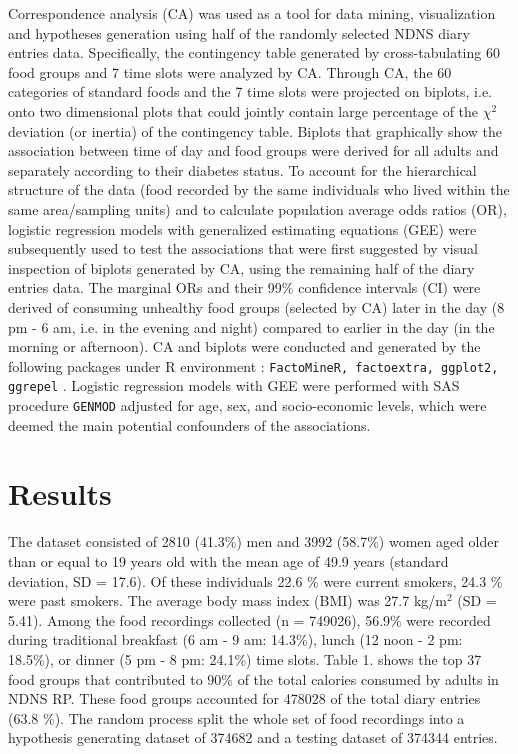 \documentclass{bmcart}
\begin{document}
Correspondence analysis (CA) \cite{greenacre2017correspondence,Chapman2017,palla2020adolescents} was used as a tool for data mining, visualization and hypotheses generation using half of the randomly selected NDNS diary entries data. Specifically, the contingency table generated by cross-tabulating 60 food groups and 7 time slots were analyzed by CA. Through CA, the 60 categories of standard foods and the 7 time slots were projected on biplots, i.e. onto two dimensional plots that could jointly contain large percentage of the $\chi^2$ deviation (or inertia) of the contingency table. Biplots that graphically show the association between time of day and food groups were derived for all adults and separately according to their diabetes status. To account for the hierarchical structure of the data (food recorded by the same individuals who lived within the same area/sampling units) and to calculate population average odds ratios (OR), logistic regression models with generalized estimating equations (GEE) were subsequently used to test the associations that were first suggested by visual inspection of biplots generated by CA, using the remaining half of the diary entries data. The marginal ORs and their 99\% confidence intervals (CI) were derived of consuming unhealthy food groups (selected by CA) later in the day (8 pm - 6 am, i.e. in the evening and night) compared to earlier in the day (in the morning or afternoon). CA and biplots were conducted and generated by the following packages under R environment \cite{Rcoreteam}: \texttt{FactoMineR, factoextra, ggplot2, ggrepel} \cite{L__2008,factoextra,ggplot2,ggrepel}. Logistic regression models with GEE were performed with SAS procedure \texttt{GENMOD} \cite{SAS94} adjusted for age, sex, and socio-economic levels, which were deemed the main potential confounders of the associations. 


\section*{Results}
The dataset consisted of 2810 (41.3\%) men and 3992 (58.7\%) women aged older than or equal to 19 years old with the mean age of 49.9 years (standard deviation, SD = 17.6). Of these individuals 22.6 \% were current smokers, 24.3 \% were past smokers. The average body mass index (BMI) was 27.7 kg/m$^2$ (SD = 5.41). Among the food recordings collected (n = 749026), 56.9\% were recorded during traditional breakfast (6 am - 9 am: 14.3\%), lunch (12 noon - 2 pm: 18.5\%), or dinner (5 pm - 8 pm: 24.1\%) time slots. Table 1. shows the top 37 food groups that contributed to 90\% of the total calories consumed by adults in NDNS RP. These food groups accounted for 478028 of the total diary entries (63.8 \%). The random process split the whole set of food recordings into a hypothesis generating dataset of 374682 and a testing dataset of 374344 entries. 
\end{document}
